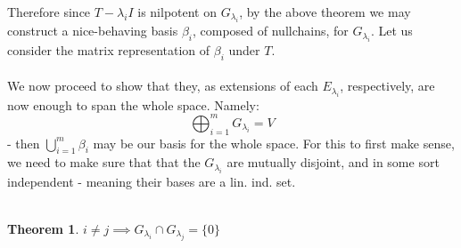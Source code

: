 \documentclass{article}
\theoremstyle{definition}
\newtheorem{theorem}{Theorem}[subsection]
\newcommand{\Gi}{G_{\lambda_i}}
\begin{document}
Therefore since $T-\lambda_iI$ is nilpotent on $G_{\lambda_i}$, by the above theorem we may construct a nice-behaving basis $\beta_i$, composed of nullchains, for $G_{\lambda_i}$.
Let us consider the matrix representation of $\beta_i$ under $T$. \\ \\
We now proceed to show that they, as extensions of each $E_{\lambda_i}$, respectively, are now enough to span the whole space. Namely:$$\bigoplus_{i=1}^mG_{\lambda_i}=V$$
- then $\bigcup_{i=1}^m\beta_i$ may be our basis for the whole space. For this to first make sense, we need to make sure that that the $\Gi$ are mutually disjoint, and in some sort independent - meaning their bases are a lin. ind. set. \\ \\
\begin{theorem}\label{thrm: disj}
    $i\neq j\implies G_{\lambda_i}\cap G_{\lambda_j}=\{0\}  $
\end{theorem}
\end{document}
